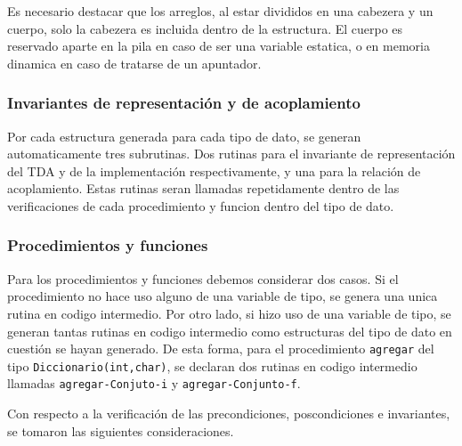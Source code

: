 Es necesario destacar que los arreglos, al estar divididos en una cabezera y
un cuerpo, solo la cabezera es incluida dentro de la estructura. El cuerpo es
reservado aparte en la pila en caso de ser una variable estatica, o en memoria
dinamica en caso de tratarse de un apuntador.

\subsubsection{Invariantes de representación y de acoplamiento}
Por cada estructura generada para cada tipo de dato, se generan
automaticamente tres subrutinas. Dos rutinas para el invariante de
representación del TDA y de la implementación respectivamente, y una para la
relación de acoplamiento. Estas rutinas seran llamadas repetidamente dentro de
las verificaciones de cada procedimiento y funcion dentro del tipo de dato.

\subsubsection{Procedimientos y funciones}
Para los procedimientos y funciones debemos considerar dos casos. Si el
procedimiento no hace uso alguno de una variable de tipo, se genera una unica
rutina en codigo intermedio. Por otro lado, si hizo uso de una variable de
tipo, se generan tantas rutinas en codigo intermedio como estructuras del tipo
de dato en cuestión se hayan generado. De esta forma, para el procedimiento \texttt{agregar} del tipo \texttt{Diccionario(int,char)}, se declaran dos rutinas en codigo intermedio llamadas
\texttt{agregar-Conjuto-i} y \texttt{agregar-Conjunto-f}.

Con respecto a la verificación de las precondiciones, poscondiciones e
invariantes, se tomaron las siguientes consideraciones.

